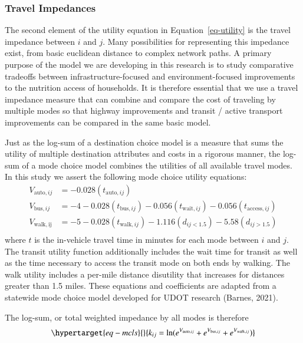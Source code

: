 \documentclass[
  letterpaper,
  authoryear,
  review,
  3p]{elsarticle}
\begin{document}
\hypertarget{sec-mcls}{%
\subsubsection{Travel Impedances}\label{sec-mcls}}

The second element of the utility equation in Equation~\ref{eq-utility}
is the travel impedance between \(i\) and \(j\). Many possibilities for
representing this impedance exist, from basic euclidean distance to
complex network paths. A primary purpose of the model we are developing
in this research is to study comparative tradeoffs between
infrastructure-focused and environment-focused improvements to the
nutrition access of households. It is therefore essential that we use a
travel impedance measure that can combine and compare the cost of
traveling by multiple modes so that highway improvements and transit /
active transport improvements can be compared in the same basic model.

Just as the log-sum of a destination choice model is a measure that sums
the utility of multiple destination attributes and costs in a rigorous
manner, the log-sum of a mode choice model combines the utilities of all
available travel modes. In this study we assert the following mode
choice utility equations: \begin{align*} 
  V_{\mathrm{auto}, ij} &= -0.028(t_{\mathrm{auto}, ij})\\
  V_{\mathrm{bus}, ij} &= -4 -0.028(t_{\mathrm{bus}, ij}) -0.056(t_{\mathrm{wait}, ij}) -0.056(t_{\mathrm{access}, ij})\\
  V_{\mathrm{walk, ij}} &= -5 -0.028(t_{\mathrm{walk}, ij}) -1.116(d_{ij<1.5}) -5.58(d_{ij>1.5})\\
\end{align*} where \(t\) is the in-vehicle travel time in minutes for
each mode between \(i\) and \(j\). The transit utility function
additionally includes the wait time for transit as well as the time
necessary to access the transit mode on both ends by walking. The walk
utility includes a per-mile distance disutility that increases for
distances greater than 1.5 miles. These equations and coefficients are
adapted from a statewide mode choice model developed for UDOT research
(Barnes, 2021).

The log-sum, or total weighted impedance by all modes is therefore
\begin{equation}\protect\hypertarget{eq-mcls}{}{
k_{ij} = \ln(e^{V_{\mathrm{auto}, ij}} + e^{V_{\mathrm{bus}, ij}} + e^{V_{\mathrm{walk},ij}})
}\label{eq-mcls}\end{equation}
\end{document}
